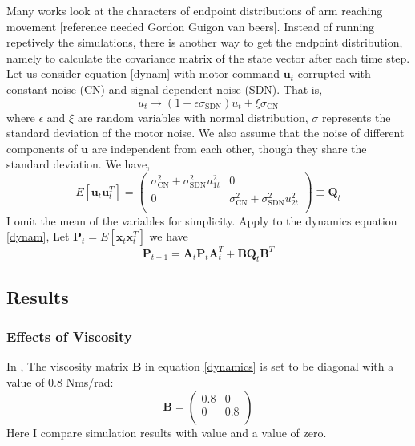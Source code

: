 Many works look at the characters of endpoint distributions of arm reaching movement [reference needed Gordon Guigon van beers]. Instead of running repetively the simulations, there is another way to get the endpoint distribution, namely to calculate the covariance matrix of the state vector after each time step. Let us consider equation \ref{dynam} with motor command $\bm{u}_t$ corrupted with constant noise (CN) and signal dependent noise (SDN). That is,
\begin{equation}
u_t \rightarrow (1 + \epsilon\sigma_{\text{SDN}}) u_t + \xi\sigma_{\text{CN}}
\end{equation}
where $\epsilon$ and $\xi$ are random variables with normal distribution, $\sigma$ represents the standard deviation of the motor noise. We also assume that the noise of different components of $\bm{u}$ are independent from each other, though they share the standard deviation. We have,
\begin{equation}
E[\bm{u}_t\bm{u}_t^T] = 
\left(\begin{matrix}
\sigma_{\text{CN}}^2 + 		\sigma_{\text{SDN}}^2 u_{1t}^2   &  0 \\
0  &   \sigma_{\text{CN}}^2 + 		\sigma_{\text{SDN}}^2 u_{2t}^2   \\
\end{matrix}\right)  \equiv \bm{Q}_t
\end{equation}
I omit the mean of the variables for simplicity. Apply to the dynamics equation \ref{dynam}, Let $\bm{P}_t = E[\bm{x}_{t}\bm{x}_{t}^T]$ we have
\begin{equation}
\bm{P}_{t+1} = \bm{A}_t \bm{P}_t\bm{A}_t^T + \bm{B}\bm{Q}_t\bm{B}^T
\end{equation}

\subsection{Results}\label{results}
\subsubsection{Effects of Viscosity}
In \cite{VanBeers2004}, The viscosity matrix $\bm{B}$ in equation \ref{dynamics} is set to be diagonal with a value of 0.8 Nms/rad:
\begin{equation}
\bm{B} = 
\left(\begin{matrix}
0.8 & 0 \\
0 & 0.8 \\
\end{matrix}\right)
\end{equation}
Here I compare simulation results with \cite{VanBeers2004} value and a value of zero.

